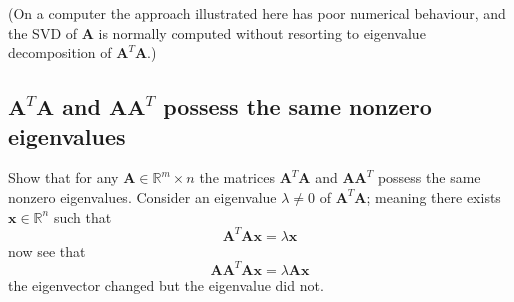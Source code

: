\documentclass{report}
\begin{document}
(On a computer the approach illustrated here has poor numerical behaviour, and the SVD of $\bm{A}$ is normally
computed without resorting to eigenvalue decomposition of 
$\bm{A}^T\bm{A}$.)
\newpage

\subsection{$\bm{A}^T\bm{A}$ and $\bm{AA}^T$ possess the
same nonzero eigenvalues}
Show that for any $\bm{A}\in\mathbb{R}^m\times n$ the matrices $\bm{A}^T\bm{A}$ and $\bm{AA}^T$ possess the
same nonzero eigenvalues. Consider an eigenvalue 
$\lambda\neq0$ of $\bm{A}^T\bm{A}$; meaning there exists
$\bm{x}\in\mathbb{R}^n$ such that
\begin{equation*}
\bm{A}^T\bm{A}\bm{x}=\lambda\bm{x}
\end{equation*}
now see that
\begin{equation*}
\bm{A}\bm{A}^T\bm{A}\bm{x}=\lambda\bm{A}\bm{x}
\end{equation*}
the eigenvector changed but the eigenvalue did not. 
\newpage
\end{document}
